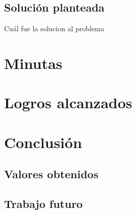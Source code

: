 \documentclass[a4paper,oneside,10pt]{article}
\begin{document}
\subsection{Soluci\'on planteada}
Cu\'al fue la solucion al problema

\section{Minutas}

\section{Logros alcanzados}

\section{Conclusi\'on}

\subsection{Valores obtenidos}
\subsection{Trabajo futuro}
\end{document}
